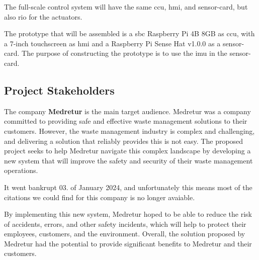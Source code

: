 \documentclass[../main.tex]{subfiles}
\begin{document}
The full-scale control system will have the same \gls{ccu},
\gls{hmi}, and \gls{sensor-card}, but also \gls{rio} for the \glspl{actuator}.

The prototype that will be assembled is a \gls{sbc}
Raspberry Pi 4B 8GB\cite{pi} as \gls{ccu}, with a 7-inch touchscreen\cite{pi-screen} as \gls{hmi}
and a Raspberry Pi Sense Hat v1.0.0\cite{pi-sense-hat} as a \gls{sensor-card}.
The purpose of constructing the prototype is to use the \gls{imu} in
the \gls{sensor-card}.

\subsection{Project Stakeholders}

The company \textbf{Medretur} is the main target audience.
Medretur was a company committed to
providing safe and effective waste management solutions to their
customers.
However, the waste management industry is complex and
challenging, and delivering a solution that reliably provides
this is not easy. The proposed project seeks to help Medretur
navigate this complex landscape by developing a new system that
will improve the safety and security of their waste management
operations.

It went bankrupt 03. of January 2024, and unfortunately this means most of the citations we could find for this company is no longer avaiable.

By implementing this new system, Medretur hoped to be able to reduce
the risk of accidents, errors, and other safety incidents, which
will help to protect their employees, customers, and the
environment.
Overall, the solution proposed by Medretur had the potential to provide
significant benefits to Medretur and their customers.

\end{document}
